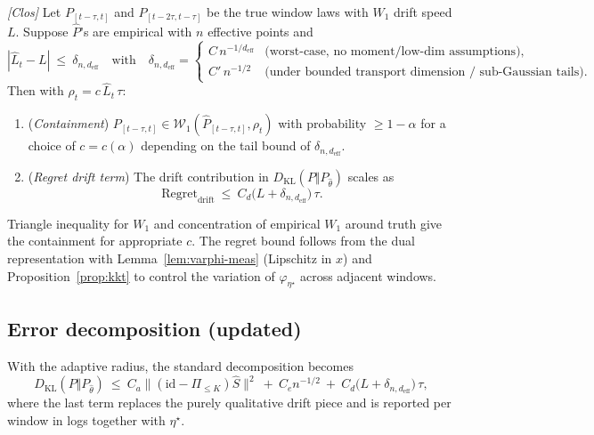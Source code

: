 \begin{theorem}\label{thm:adaptive-radius}
\emph{[\textup{Clos}]} Let $P_{[t-\tau,t]}$ and $P_{[t-2\tau,t-\tau]}$ be the true window laws with $W_1$ drift speed $L$. Suppose $\hat P$'s are empirical with $n$ effective points and
\[
|\hat L_t - L|\ \le\ \delta_{n,d_{\mathrm{eff}}}
\quad\text{with}\quad
\delta_{n,d_{\mathrm{eff}}}=\begin{cases}
C\,n^{-1/d_{\mathrm{eff}}} & \text{(worst-case, no moment/low-dim assumptions)},\\[2pt]
C'\,n^{-1/2} & \text{(under bounded transport dimension / sub-Gaussian tails)}.
\end{cases}
\]
Then with $\rho_t=c\,\hat L_t\,\tau$:
\begin{enumerate}[leftmargin=*]
\item (\emph{Containment}) $P_{[t-\tau,t]} \in \mathcal W_1(\hat P_{[t-\tau,t]},\rho_t)$ with probability $\ge 1-\alpha$ for a choice of $c=c(\alpha)$ depending on the tail bound of $\delta_{n,d_{\mathrm{eff}}}$.
\item (\emph{Regret drift term}) The drift contribution in $D_{\mathrm{KL}}(P\Vert P_{\widehat\theta})$ scales as
\[
\mathrm{Regret}_\mathrm{drift}\ \le\ C_d \big(L+\delta_{n,d_{\mathrm{eff}}}\big)\,\tau.
\]
\end{enumerate}
\begin{proofsketch}
Triangle inequality for $W_1$ and concentration of empirical $W_1$ around truth give the containment for appropriate $c$. The regret bound follows from the dual representation with Lemma~\ref{lem:varphi-meas} (Lipschitz in $x$) and Proposition~\ref{prop:kkt} to control the variation of $\varphi_{\eta^\star}$ across adjacent windows.
\end{proofsketch}
\end{theorem}

\subsection{Error decomposition (updated)}
With the adaptive radius, the standard decomposition becomes
\[
D_{\mathrm{KL}}(P\Vert P_{\widehat\theta})
\ \le\ C_a\big\|(\mathrm{id}-\Pi_{\le K})\hat S\big\|^2\ +\ C_e n^{-1/2}\ +\ C_d\big(L+\delta_{n,d_{\mathrm{eff}}}\big)\,\tau,
\]
where the last term replaces the purely qualitative drift piece and is reported per window in logs together with $\eta^\star$.

